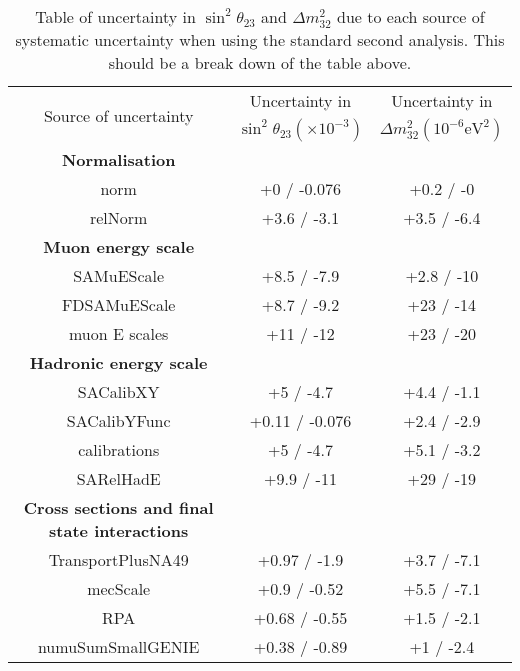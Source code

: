 \begin{table*}[t]
  \centering
  \caption{
    Table of uncertainty in $\sin^2\!\theta_{23}$ and $\Delta
    m^2_{32}$ due to each source of systematic uncertainty when
    using the standard second analysis. This should be a break down of
    the table above.
  }
  \begin{tabular}{c c c}
    \hline 
    \multirow{2}{*}{Source of uncertainty} & 
                                             Uncertainty in & 
                                                              Uncertainty in \\
                                           & $\sin^2\!\theta_{23}
                                             (\times 10^{-3})$ & 
                                                                 $\Delta
                                                                 m^2_{32}
                                                                 \left(10^{-6}\text{
                                                                 eV}^{2}\right)$\\
    \hline 
    \textbf{Normalisation} & & \\
    norm & +0 / -0.076 & +0.2 / -0\\
    relNorm & +3.6 / -3.1 & +3.5 / -6.4\\
    \textbf{Muon energy scale} & & \\
    SAMuEScale & +8.5 / -7.9 & +2.8 / -10\\
    FDSAMuEScale & +8.7 / -9.2 & +23 / -14\\
    \hline
    muon E scales & +11 / -12 & +23 / -20\\
    \textbf{Hadronic energy scale} & & \\
    SACalibXY & +5 / -4.7 & +4.4 / -1.1\\
    SACalibYFunc & +0.11 / -0.076 & +2.4 / -2.9\\
    calibrations & +5 / -4.7 & +5.1 / -3.2\\
    SARelHadE & +9.9 / -11 & +29 / -19\\
    \textbf{Cross sections and final state interactions} & & \\
    TransportPlusNA49 & +0.97 / -1.9 & +3.7 / -7.1\\
    mecScale & +0.9 / -0.52 & +5.5 / -7.1\\
    RPA & +0.68 / -0.55 & +1.5 / -2.1\\
    numuSumSmallGENIE & +0.38 / -0.89 & +1 / -2.4\\

\end{tabular}
\end{table*}
